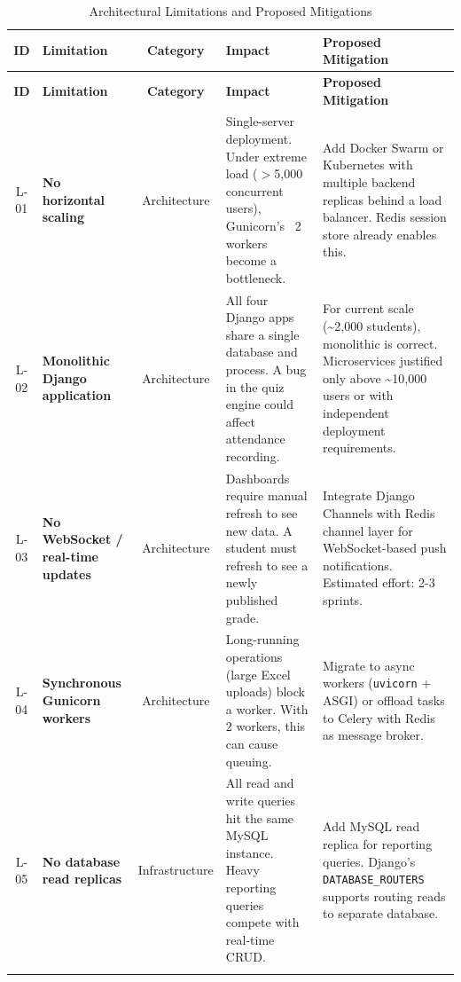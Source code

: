 \begingroup
\small
\renewcommand{\arraystretch}{1.3}
\begin{longtable}{|c|p{2.5cm}|c|p{3.5cm}|p{4.5cm}|}
    \hline
    \textbf{ID} & \textbf{Limitation} & \textbf{Category} & \textbf{Impact} & \textbf{Proposed Mitigation} \\
    \hline
    \endfirsthead
    \hline
    \textbf{ID} & \textbf{Limitation} & \textbf{Category} & \textbf{Impact} & \textbf{Proposed Mitigation} \\
    \hline
    \endhead
    \hline
    \endfoot
    L-01 & \textbf{No horizontal scaling} & Architecture & Single-server deployment. Under extreme load ($>$5,000 concurrent users), Gunicorn's~\cite{gunicorn} 2 workers become a bottleneck. & Add Docker Swarm or Kubernetes with multiple backend replicas behind a load balancer. Redis session store already enables this. \\
    \hline
    L-02 & \textbf{Monolithic Django~\cite{django} application} & Architecture & All four Django apps share a single database and process. A bug in the quiz engine could affect attendance recording. & For current scale (\textasciitilde2,000 students), monolithic is correct. Microservices justified only above \textasciitilde10,000 users or with independent deployment requirements. \\
    \hline
    L-03 & \textbf{No WebSocket / real-time updates} & Architecture & Dashboards require manual refresh to see new data. A student must refresh to see a newly published grade. & Integrate Django Channels with Redis channel layer for WebSocket-based push notifications. Estimated effort: 2-3 sprints. \\
    \hline
    L-04 & \textbf{Synchronous Gunicorn workers} & Architecture & Long-running operations (large Excel uploads) block a worker. With 2 workers, this can cause queuing. & Migrate to async workers (\texttt{uvicorn} + ASGI) or offload tasks to Celery with Redis as message broker. \\
    \hline
    L-05 & \textbf{No database read replicas} & Infrastructure & All read and write queries hit the same MySQL~\cite{mysql} instance. Heavy reporting queries compete with real-time CRUD. & Add MySQL read replica for reporting queries. Django's \texttt{DATABASE\_ROUTERS} supports routing reads to separate database. \\
    \hline
    \caption{Architectural Limitations and Proposed Mitigations}
    \label{tab:arch-limitations}
\end{longtable}
\endgroup

